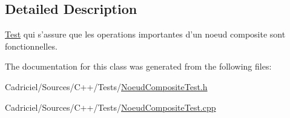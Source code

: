 \subsection{Detailed Description}
\hyperlink{class_test}{Test} qui s'assure que les operations importantes d'un noeud composite sont fonctionnelles. 

The documentation for this class was generated from the following files\-:\begin{DoxyCompactItemize}
\item 
Cadriciel/\-Sources/\-C++/\-Tests/\hyperlink{_noeud_composite_test_8h}{Noeud\-Composite\-Test.\-h}\item 
Cadriciel/\-Sources/\-C++/\-Tests/\hyperlink{_noeud_composite_test_8cpp}{Noeud\-Composite\-Test.\-cpp}\end{DoxyCompactItemize}
